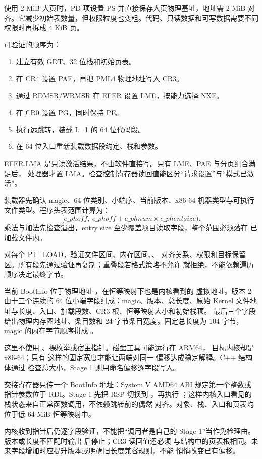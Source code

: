 使用 2 MiB 大页时，PD 项设置 PS 并直接保存大页物理基址，地址需 2 MiB
对齐。它减少初始表数量，但权限粒度也变粗。代码、只读数据和可写数据需要不同
权限时再拆成 4 KiB 页。

可验证的顺序为：

\begin{enumerate}[label=\arabic*.]
  \item 建立有效 GDT、32 位栈和初始页表。
  \item 在 CR4 设置 PAE，再把 PML4 物理地址写入 CR3。
  \item 通过 RDMSR/WRMSR 在 EFER 设置 LME，按能力选择 NXE。
  \item 在 CR0 设置 PG，同时保持 PE。
  \item 执行远跳转，装载 L=1 的 64 位代码段。
  \item 在 64 位入口重新装载数据段约定、栈和参数。
\end{enumerate}

EFER.LMA 是只读激活结果，不由软件直接写。只有 LME、PAE 与分页组合满足后，
处理器才置 LMA。检查控制寄存器读回值能区分“请求设置”与“模式已激活”。

装载器先确认 magic、64 位类别、小端序、当前版本、x86-64 机器类型与可执行
文件类型。程序头表范围计算为：
\[
  [e\_phoff,\ e\_phoff+e\_phnum\times e\_phentsize).
\]
乘法与加法先检查溢出，entry size 至少覆盖项目读取字段，整个范围必须落在
已加载文件内。

对每个 PT\_LOAD，验证文件区间、内存区间、、
对齐关系、权限和目标保留区。所有段先通过验证再复制；重叠段若格式策略不允许
就拒绝，不能依赖遍历顺序决定最终字节。

当前 BootInfo 位于物理地址 ，在恒等映射下也是内核看到的
虚拟地址。版本 2 由十三个连续的 64 位小端字段组成：magic、版本、总长度、原始
Kernel 文件地址与长度、入口、加载段数、CR3 根、恒等映射大小和初始栈顶。
最后三个字段给出物理内存图地址、条目数和 24 字节条目宽度。固定总长度为
104 字节，magic 的内存字节顺序拼成 。

这里不使用 、裸枚举或宿主指针。磁盘工具可能运行在 ARM64，
目标内核却是 x86-64；只有  这样的固定宽度才能让两端对同一
偏移达成稳定解释。C++ 结构体通过  检查总大小，Stage 1
则用命名偏移逐字段写入。

交接寄存器只传一个 BootInfo 地址：System V AMD64 ABI 规定第一个整数或
指针参数位于 RDI。Stage 1 先把 RSP 切换到 ，再执行
；这样内核入口看见的栈状态来自正常函数调用，不依赖跳转前的偶然
对齐。对象、栈、入口和页表均位于低 64 MiB 恒等映射中。

内核收到指针后仍逐字段验证，不能把“调用者是自己的 Stage 1”当作免检理由。
版本或长度不匹配时输出  后停止；CR3 读回值还必须
与结构中的页表根相同。未来字段增加时应提升版本或明确旧长度兼容规则，不能
悄悄改变已有偏移。
